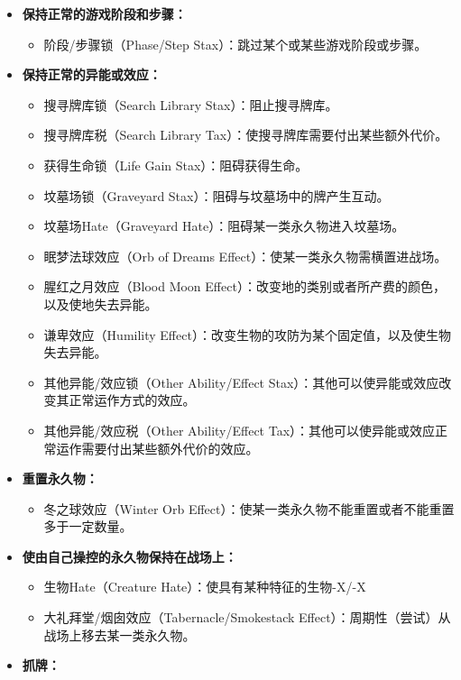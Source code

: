 \documentclass[lang = cn, color = black, 10pt]{AllThatStax}
\begin{document}
\begin{itemize}
	\item \textbf{保持正常的游戏阶段和步骤：}
		\begin{itemize}
			\item 阶段/步骤锁（Phase/Step Stax）：跳过某个或某些游戏阶段或步骤。
		\end{itemize}
	\item \textbf{保持正常的异能或效应：}
		\begin{itemize}
			\item 搜寻牌库锁（Search Library Stax）：阻止搜寻牌库。
			\item 搜寻牌库税（Search Library Tax）：使搜寻牌库需要付出某些额外代价。
			\item 获得生命锁（Life Gain Stax）：阻碍获得生命。
			\item 坟墓场锁（Graveyard Stax）：阻碍与坟墓场中的牌产生互动。
			\item 坟墓场Hate（Graveyard Hate）：阻碍某一类永久物进入坟墓场。
			\item 眠梦法球效应（Orb of Dreams Effect）：使某一类永久物需横置进战场。
			\item 腥红之月效应（Blood Moon Effect）：改变地的类别或者所产费的颜色，以及使地失去异能。
			\item 谦卑效应（Humility Effect）：改变生物的攻防为某个固定值，以及使生物失去异能。
			\item 其他异能/效应锁（Other Ability/Effect Stax）：其他可以使异能或效应改变其正常运作方式的效应。
			\item 其他异能/效应税（Other Ability/Effect Tax）：其他可以使异能或效应正常运作需要付出某些额外代价的效应。
		\end{itemize}
	\item \textbf{重置永久物：}
		\begin{itemize}
			\item 冬之球效应（Winter Orb Effect）：使某一类永久物不能重置或者不能重置多于一定数量。
		\end{itemize}
	\item \textbf{使由自己操控的永久物保持在战场上：}
		\begin{itemize}
			\item 生物Hate（Creature Hate）：使具有某种特征的生物-X/-X
			\item 大礼拜堂/烟囱效应（Tabernacle/Smokestack Effect）：周期性（尝试）从战场上移去某一类永久物。
		\end{itemize}
	\item \textbf{抓牌：}
		\begin{itemize}

\end{itemize}
\end{itemize}
\end{document}
